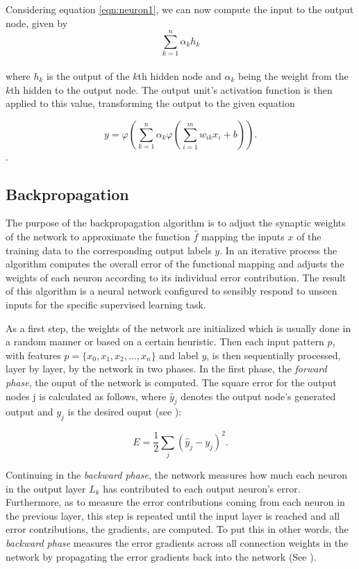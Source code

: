 Considering equation \ref{eqn:neuron1}, we can now compute the input to the output node, given by\\
\begin{equation}
  \sum_{k=1}^{n} \alpha_k h_k
\end{equation}
\\
where $h_k$ is the output of the $k$th hidden node and $\alpha_k$ being the weight from the $k$th hidden to the output node. The output unit's activation function is then applied to this value, transforming the output to the given equation

\begin{equation}
  y = \varphi\left(\sum_{k=1}^{n} \alpha_k \varphi \left(\sum_{i=1}^{m} w_{ik} x_i + b \right)\right).
\end{equation}.

\subsection{Backpropagation}
\label{sec:backprop}
The purpose of the backpropagation algorithm \cite{rumelhart1988learning} is to adjust the synaptic weights of the network to approximate the function $\hat f$ mapping the inputs $x$ of the training data to the corresponding output labels $y$. In an iterative process the algorithm computes the overall error of the functional mapping and adjusts the weights of each neuron according to its individual error contribution. The result of this algorithm is a neural network configured to sensibly respond to unseen inputs for the specific supervised learning task.

As a first step, the weights of the network are initialized which is usually done in a random manner or based on a certain heuristic. Then each input pattern $p$, with features $p = \{x_0,x_1, x_2, \dots, x_n \}$ and label $y$, is then sequentially processed, layer by layer, by the network in two phases. In the first phase, the \textit{forward phase}, the ouput of the network is computed. The square error for the output nodes j is calculated as follows, where $\hat{y}_j$ denotes the output node's generated output and $y_j$ is the desired ouput (see \cite{Haykin:1998:NNC:521706}):

\begin{equation}
  E = \frac{1}{2}\sum_{j} (\hat{y}_j - y_j)^2.
\end{equation}

Continuing in the \textit{backward phase}, the network measures how much each neuron in the output layer $L_k$ has contributed to each output neuron's error. Furthermore, as to measure the error contributions coming from each neuron in the previous layer, this step is repeated until the input layer is reached and all error contributions, the gradients, are computed. To put this in other words, the \textit{backward phase} measures the error gradients across all connection weights in the network by propagating the error gradients back into the network (See \cite{Mitchell:1997:ML:541177}).

